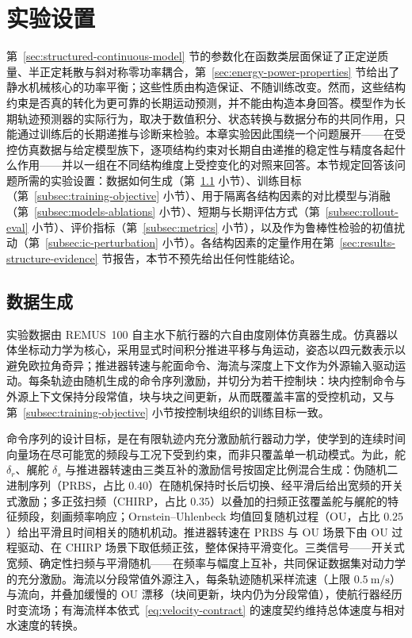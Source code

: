 \section{实验设置}
\label{sec:training-baselines-protocol}

第~\ref{sec:structured-continuous-model} 节的参数化在函数类层面保证了正定逆质量、半正定耗散与斜对称零功率耦合，第~\ref{sec:energy-power-properties} 节给出了静水机械核心的功率平衡；这些性质由构造保证、不随训练改变。然而，这些结构约束是否真的转化为更可靠的长期运动预测，并不能由构造本身回答。模型作为长期轨迹预测器的实际行为，取决于数值积分、状态转换与数据分布的共同作用，只能通过训练后的长期递推与诊断来检验。本章实验因此围绕一个问题展开——在受控仿真数据与给定模型族下，逐项结构约束对长期自由递推的稳定性与精度各起什么作用——并以一组在不同结构维度上受控变化的对照来回答。本节规定回答该问题所需的实验设置：数据如何生成（第~\ref{subsec:data-generation} 小节）、训练目标（第~\ref{subsec:training-objective} 小节）、用于隔离各结构因素的对比模型与消融（第~\ref{subsec:models-ablations} 小节）、短期与长期评估方式（第~\ref{subsec:rollout-eval} 小节）、评价指标（第~\ref{subsec:metrics} 小节），以及作为鲁棒性检验的初值扰动（第~\ref{subsec:ic-perturbation} 小节）。各结构因素的定量作用在第~\ref{sec:results-structure-evidence} 节报告，本节不预先给出任何性能结论。

\subsection{数据生成}
\label{subsec:data-generation}

实验数据由 REMUS~100 自主水下航行器的六自由度刚体仿真器生成。仿真器以体坐标动力学为核心，采用显式时间积分推进平移与角运动，姿态以四元数表示以避免欧拉角奇异；推进器转速与舵面命令、海流与深度上下文作为外源输入驱动运动。每条轨迹由随机生成的命令序列激励，并切分为若干控制块：块内控制命令与外源上下文保持分段常值，块与块之间更新，从而既覆盖丰富的受控机动，又与第~\ref{subsec:training-objective} 小节按控制块组织的训练目标一致。

命令序列的设计目标，是在有限轨迹内充分激励航行器动力学，使学到的连续时间向量场在尽可能宽的频段与工况下受到约束，而非只覆盖单一机动模式。为此，舵 \(\delta_r\)、艉舵 \(\delta_s\) 与推进器转速由三类互补的激励信号按固定比例混合生成：伪随机二进制序列（PRBS，占比 \(0.40\)）在随机保持时长后切换、经平滑后给出宽频的开关式激励；多正弦扫频（CHIRP，占比 \(0.35\)）以叠加的扫频正弦覆盖舵与艉舵的特征频段，刻画频率响应；Ornstein--Uhlenbeck 均值回复随机过程（OU，占比 \(0.25\)）给出平滑且时间相关的随机机动。推进器转速在 PRBS 与 OU 场景下由 OU 过程驱动、在 CHIRP 场景下取低频正弦，整体保持平滑变化。三类信号——开关式宽频、确定性扫频与平滑随机——在频率与幅度上互补，共同保证数据集对动力学的充分激励。海流以分段常值外源注入，每条轨迹随机采样流速（上限 \(0.5~\mathrm{m/s}\)）与流向，并叠加缓慢的 OU 漂移（块间更新，块内仍为分段常值），使航行器经历时变流场；有海流样本依式~\eqref{eq:velocity-contract} 的速度契约维持总体速度与相对水速度的转换。

